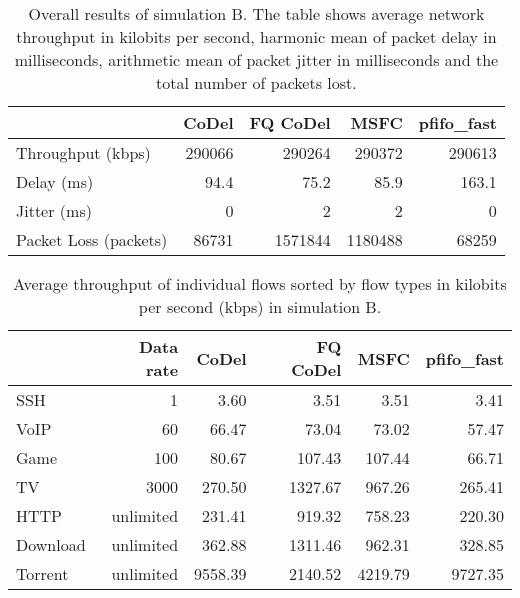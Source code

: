 \begin{table}[]
	\centering
	\begin{tabular}{@{}lrrrr@{}}
		\toprule
								& CoDel & FQ CoDel & MSFC & pfifo\_fast  \\ \midrule
		Throughput (kbps)       & 290066    & 290264 & 290372   & 290613 \\
		Delay (ms)              & 94.4      & 75.2   & 85.9     & 163.1    \\
		Jitter (ms)             & 0         & 2      & 2        & 0      \\
		Packet Loss (packets)   & 86731     & 1571844& 1180488  & 68259  \\ \bottomrule
	\end{tabular}
	\caption{Overall results of simulation B. The table shows average network throughput in kilobits per second, harmonic mean of packet delay in milliseconds, arithmetic mean of packet jitter in milliseconds and the total number of packets lost.}
	\label{tab:results_B}
\end{table}

\begin{table}
	\centering
	\begin{tabular}{@{}l|rrrrr@{}}
		\toprule
		         & {Data rate} & {CoDel} & {FQ CoDel} &  {MSFC} & {pfifo\_fast} \\ \midrule
		SSH      &           1 &    3.60 &       3.51 &    3.51 &          3.41 \\
		VoIP     &          60 &   66.47 &      73.04 &   73.02 &         57.47 \\
		Game     &         100 &   80.67 &     107.43 &  107.44 &         66.71 \\
		TV       &        3000 &  270.50 &    1327.67 &  967.26 &        265.41 \\
		HTTP     &   unlimited &  231.41 &     919.32 &  758.23 &        220.30 \\
		Download &   unlimited &  362.88 &    1311.46 &  962.31 &        328.85 \\
		Torrent  &   unlimited & 9558.39 &    2140.52 & 4219.79 &       9727.35 \\ \bottomrule
	\end{tabular}
	\caption{Average throughput of individual flows sorted by flow types in kilobits per second (kbps) in simulation B.}
	\label{tab:throughput_B}
\end{table}









